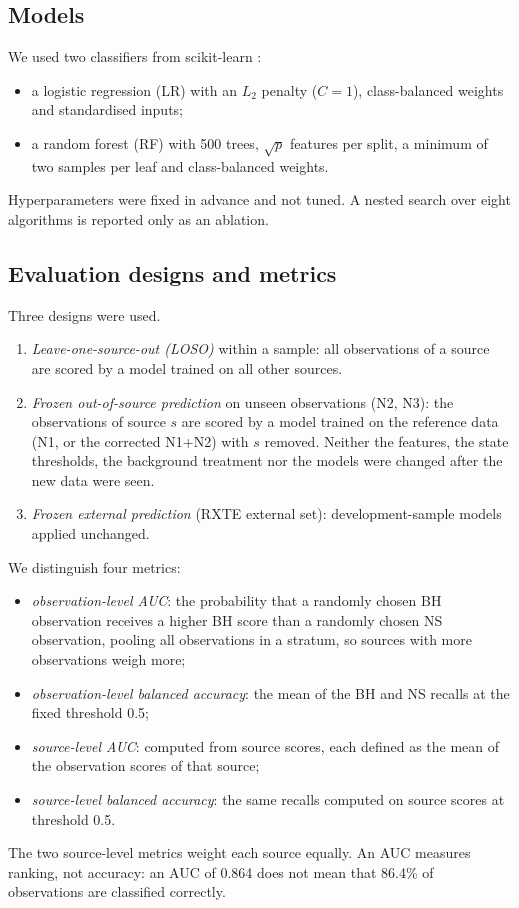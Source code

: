 \documentclass[11pt,a4paper]{article}
\begin{document}
\subsection{Models}\label{sec:models}
We used two classifiers from scikit-learn \citep{Pedregosa2011}:
\begin{itemize}\setlength\itemsep{1pt}
\item a logistic regression (LR) with an $L_2$ penalty ($C=1$), class-balanced weights and standardised inputs;
\item a random forest (RF) with 500 trees, $\sqrt{p}$ features per split, a minimum of two samples per leaf and
class-balanced weights.
\end{itemize}
Hyperparameters were fixed in advance and not tuned. A nested search over eight algorithms is reported only as an
ablation.

\subsection{Evaluation designs and metrics}\label{sec:eval}
Three designs were used.
\begin{enumerate}\setlength\itemsep{1pt}
\item \emph{Leave-one-source-out (LOSO)} within a sample: all observations of a source are scored by a model trained
on all other sources.
\item \emph{Frozen out-of-source prediction} on unseen observations (N2, N3): the observations of source $s$ are scored
by a model trained on the reference data (N1, or the corrected N1+N2) with $s$ removed. Neither the features, the state
thresholds, the background treatment nor the models were changed after the new data were seen.
\item \emph{Frozen external prediction} (RXTE external set): development-sample models applied unchanged.
\end{enumerate}

We distinguish four metrics:
\begin{itemize}\setlength\itemsep{1pt}
\item \emph{observation-level AUC}: the probability that a randomly chosen BH observation receives a higher BH score
than a randomly chosen NS observation, pooling all observations in a stratum, so sources with more observations weigh
more;
\item \emph{observation-level balanced accuracy}: the mean of the BH and NS recalls at the fixed threshold 0.5;
\item \emph{source-level AUC}: computed from source scores, each defined as the mean of the observation scores of that
source;
\item \emph{source-level balanced accuracy}: the same recalls computed on source scores at threshold 0.5.
\end{itemize}
The two source-level metrics weight each source equally. An AUC measures ranking, not accuracy: an AUC of 0.864 does not
mean that 86.4\% of observations are classified correctly.
\end{document}
